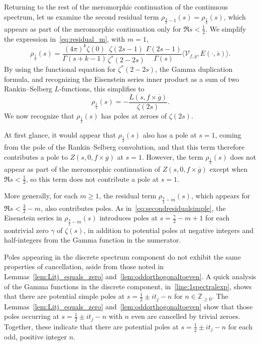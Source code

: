 Returning to the rest of the meromorphic continuation of the continuous spectrum, let us
examine the second residual term $\rho_{\frac{3}{2} - 1}(s) = \rho_{\frac{1}{2}}(s)$,
which appears as part of the meromorphic continuation only for $\Re s < \tfrac{1}{2}$.
We simplify the expression in~\eqref{eq:residual_m}, with $m = 1$,
\begin{equation}
  \rho_{\frac{1}{2}}(s) = \frac{(4\pi)^k \zeta(0)}{\Gamma(s + k - 1)} \frac{\zeta(2s
  -1)}{\zeta^*(2 - 2s)} \frac{\Gamma(2s - 1)}{\Gamma(s)} \langle
\mathcal{V}_{f,\overline{g}}, E(\cdot, \overline{s})\rangle.
\end{equation}
By using the functional equation for $\zeta^*(2 - 2s)$, the Gamma duplication formula, and
recognizing the Eisenstein series inner product as a sum of
two Rankin--Selberg $L$-functions, this simplifies to %
\begin{equation}\label{eq:secondresidualsimple}
  \rho_{\frac{1}{2}}(s) = -\frac{L(s, f\times \overline{g})}{\zeta(2s)}.
\end{equation}
We now recognize that $\rho_{\frac{1}{2}}(s)$ has poles at zeroes of $\zeta(2s)$.



\begin{remark}
  At first glance, it would appear that $\rho_{\frac{1}{2}}(s)$ also has a pole at $s=1$,
  coming from the pole of the Rankin--Selberg convolution, %
  and that this term therefore contributes a pole to $Z(s, 0, f\times \overline{g})$ at
  $s=1$.
  However, the term $\rho_{\frac{1}{2}}(s)$ does not appear as part of the meromorphic
  continuation of $Z(s, 0, f\times \overline{g})$ except when $\Re s < \frac{1}{2}$, so
  this term does not contribute a pole at $s = 1$.
\end{remark}


More generally, for each $m \geq 1$, the residual term $\rho_{\frac{3}{2} - m}(s)$, which
appears for $\Re s < \frac{3}{2} - m$, also contributes poles.
As in~\eqref{eq:secondresidualsimple}, the Eisenstein series in $\rho_{\frac{3}{2} -
m}(s)$ introduces poles at $s = \frac{\gamma}{2} - m + 1$ for each nontrivial zero
$\gamma$ of $\zeta(s)$, in addition to potential poles at negative integers and
half-integers from the Gamma function in the numerator.


Poles appearing in the discrete spectrum component do not exhibit the same properties of
cancellation, aside from those noted in Lemmas~\ref{lem:Litj_equals_zero}
and~\ref{lem:oddorthogonaltoeven}.
A quick analysis of the Gamma functions in the discrete component,
in~\eqref{line:1spectralexp}, shows that there are potential simple poles at $s =
\frac{1}{2} \pm it_j - n$ for $n \in \mathbb{Z}_{\geq 0}$.
The Lemmas~\ref{lem:Litj_equals_zero} and~\ref{lem:oddorthogonaltoeven} show that those
poles occurring at $s = \frac{1}{2} \pm it_j - n$ with $n$ even are cancelled by trivial
zeroes.
Together, these indicate that there are potential poles at $s = \frac{1}{2} \pm it_j - n$
for each odd, positive integer $n$.



